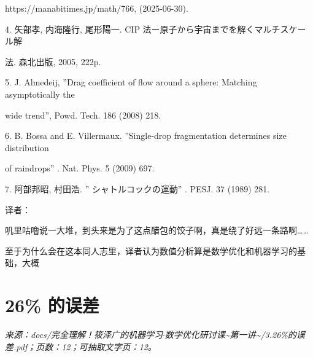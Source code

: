 https://manabitimes.jp/math/766, (2025-06-30).\par
4. 矢部孝, 内海隆行, 尾形陽一. CIP 法ー原子から宇宙までを解くマルチスケール解\par
法. 森北出版, 2005, 222p.\par
5. J. Almedeij, ”Drag coeﬀicient of flow around a sphere: Matching asymptotically the\par
wide trend”, Powd. Tech. 186 (2008) 218.\par
6. B. Bossa and E. Villermaux. ”Single-drop fragmentation determines size distribution\par
of raindrops” . Nat. Phys. 5 (2009) 697.\par
7. 阿部邦昭, 村田浩. ” シャトルコックの運動” . PESJ. 37 (1989) 281.\par

译者：\par
叽里咕噜说一大堆，到头来是为了这点醋包的饺子啊，真是绕了好远一条路啊……\par
至于为什么会在这本同人志里，译者认为数值分析算是数学优化和机器学习的基础，大概\par
\endgroup
\clearpage
\section*{26\% 的误差}
\begingroup\small
\noindent\textit{来源：docs/完全理解！筱泽广的机器学习$\cdot$数学优化研讨课\textasciitilde{}第一讲\textasciitilde{}/3.26\%的误差.pdf；页数：12；可抽取文字页：12。}\par
\endgroup
\medskip
\begingroup
\setlength{\parindent}{0pt}
\setlength{\parskip}{0.45em}


